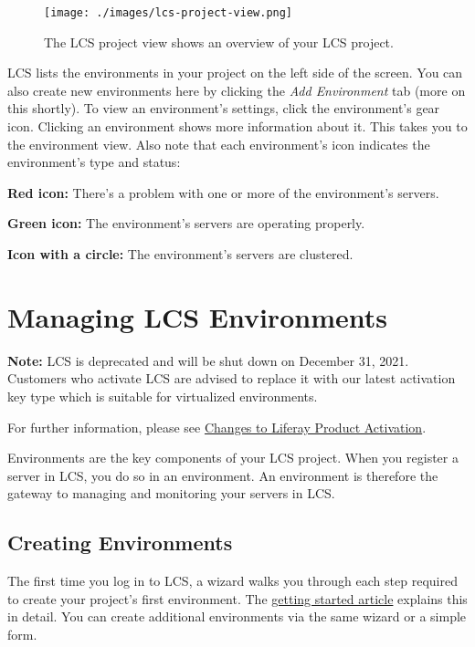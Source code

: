 \begin{figure}
\centering
\texttt{[image: ./images/lcs-project-view.png]}
\caption{The LCS project view shows an overview of your LCS project.}
\end{figure}

LCS lists the environments in your project on the left side of the
screen. You can also create new environments here by clicking the
\emph{Add Environment} tab (more on this shortly). To view an
environment's settings, click the environment's gear icon. Clicking an
environment shows more information about it. This takes you to the
environment view. Also note that each environment's icon indicates the
environment's type and status:

\textbf{Red icon:} There's a problem with one or more of the
environment's servers.

\textbf{Green icon:} The environment's servers are operating properly.

\textbf{Icon with a circle:} The environment's servers are clustered.

\chapter{Managing LCS Environments}\label{managing-lcs-environments}

\noindent\hrulefill

\textbf{Note:} LCS is deprecated and will be shut down on December 31,
2021. Customers who activate LCS are advised to replace it with our
latest activation key type which is suitable for virtualized
environments.

For further information, please see
\href{https://help.liferay.com/hc/en-us/articles/4402347960845-Changes-to-Liferay-Product-Activation}{Changes
to Liferay Product Activation}.

\noindent\hrulefill

Environments are the key components of your LCS project. When you
register a server in LCS, you do so in an environment. An environment is
therefore the gateway to managing and monitoring your servers in LCS.

\section{Creating Environments}\label{creating-environments}

The first time you log in to LCS, a wizard walks you through each step
required to create your project's first environment. The
\href{/docs/7-2/deploy/-/knowledge_base/d/getting-started-with-lcs}{getting
started article} explains this in detail. You can create additional
environments via the same wizard or a simple form.

